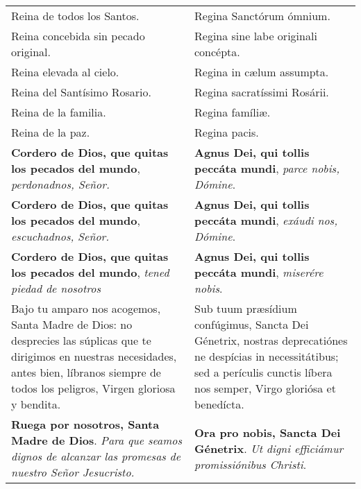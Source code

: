 \documentclass[./devocionario.tex]{subfiles}
\begin{document}
\begin{longtable} { p{} p{} }
        Reina de todos los Santos. & Regina Sanctórum ómnium.\\
        Reina concebida sin pecado original. & Regina sine labe originali concépta.\\
        Reina elevada al cielo. & Regina in cælum assumpta.\\
        Reina del Santísimo Rosario. & Regina sa­cra­tíssimi Rosárii.\\
        Reina de la familia. & Regina famíliæ.\\
        Reina de la paz. & Regina pacis.\\
        \textbf{Cordero de Dios, que quitas los pecados del mundo}, \textit{perdonadnos, Señor.} &
        \textbf{Agnus Dei, qui tollis peccáta mundi}, \textit{parce nobis, Dómine}.\\
        \textbf{Cordero de Dios, que quitas los pecados del mundo}, \textit{escuchadnos, Señor.} &
        \textbf{Agnus Dei, qui tollis peccáta mundi}, \textit{exáudi nos, Dómine}.\\
        \textbf{Cordero de Dios, que quitas los pecados del mundo}, \textit{tened piedad de nosotros} &
        \textbf{Agnus Dei, qui tollis peccáta mundi}, \textit{miserére nobis}.\\
        Bajo tu amparo nos acogemos, Santa Madre de Dios: no desprecies las súplicas que te dirigimos en nuestras necesidades, 
        antes bien, líbranos siempre de todos los peligros, Virgen gloriosa y bendita. &
        Sub tuum præsídium confúgimus, Sancta Dei Génetrix, nostras de­pre­ca­tiónes ne despícias in ne­ces­si­tátibus; 
        sed a perículis cunctis líbera nos semper, Virgo gloriósa et benedícta.\\
        \textbf{Ruega por nosotros, Santa Madre de Dios}. \textit{Para que seamos dignos de alcanzar las promesas de nuestro Señor Jesucristo.} &
        \textbf{Ora pro nobis, Sancta Dei Génetrix}. \textit{Ut digni efficiámur pro­mi­ssiónibus Christi}.
        
    \end{longtable}
\end{document}
